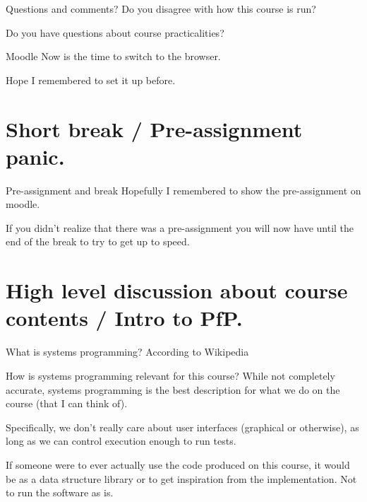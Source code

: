\documentclass[11pt, aspectratio=169, table]{beamer}
\begin{document}
\begin{frame}{Questions and comments?}
\setlength\parskip{\fill}
Do you disagree with how this course is run?

Do you have questions about course practicalities?
\end{frame}

\begin{frame}{Moodle}
\setlength\parskip{\fill}
Now is the time to switch to the browser.

Hope I remembered to set it up before.
\end{frame}

\section{Short break / Pre-assignment panic.}
\begin{frame}{Pre-assignment and break}
\setlength\parskip{\fill}
Hopefully I remembered to show the pre-assignment on moodle.

If you didn't realize that there was a pre-assignment you will now have until the end of the break to try to get up to speed.
\end{frame}

\section{High level discussion about course contents / Intro to PfP.}
\begin{frame}{What is systems programming?}
\setlength\parskip{\fill}
\pause
According to Wikipedia

\end{frame}

\begin{frame}{How is systems programming relevant for this course?}
\setlength\parskip{\fill}
\pause
While not completely accurate, systems programming is the best description for what we do on the course (that I can think of).

\pause
Specifically, we don't really care about user interfaces (graphical or otherwise), as long as we can control execution enough to 
run tests.

If someone were to ever actually use the code produced on this course, it would be as a data structure library or to get inspiration from
the implementation. Not to run the software as is.
\end{frame}
\end{document}
